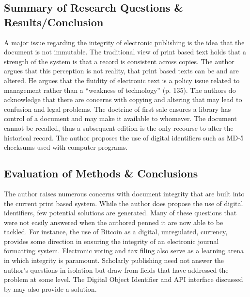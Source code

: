 \documentclass[leavefloats]{apa6e}\usepackage[]{graphicx}\usepackage[]{color}
\begin{document}



\regpar



\subsection{Summary of Research Questions \& Results/Conclusion} %
A major issue regarding the integrity of electronic publishing is the idea that the document is not immutable.  The traditional view of print based text holds that a strength of the system is that a record is consistent across copies.  The author argues that this perception is not reality, that print based texts can be and are altered.  He argues that the fluidity of electronic text is a policy issue related to management rather than a ``weakness of technology'' (p. 135).  The authors do acknowledge that there are concerns with copying and altering that may lead to confusion and legal problems.  The doctrine of first sale ensures a library has control of a document and may make it available to whomever.  The document cannot be recalled, thus a subsequent edition is the only recourse to alter the historical record.  The author proposes the use of digital identifiers such as MD-5 checksums used with computer programs.

\subsection{Evaluation of Methods \& Conclusions} %
The author raises numerous concerns with document integrity that are built into the current print based system.  While the author does propose the use of digital identifiers, few potential solutions are generated.  Many of these questions that were not easily answered when the authored penned it are now able to be tackled.  For instance, the use of Bitcoin as a digital, unregulated, currency, provides some direction in ensuring the integrity of an electronic journal formatting system.   Electronic voting and tax filing also serve as a learning arena in which integrity is paramount.  Scholarly publishing need not answer the author's questions in isolation but draw from fields that have addressed the problem at some level.  The Digital Object Identifier and API interface discussed by \textcite{Lie1999} may also provide a solution.
\end{document}
